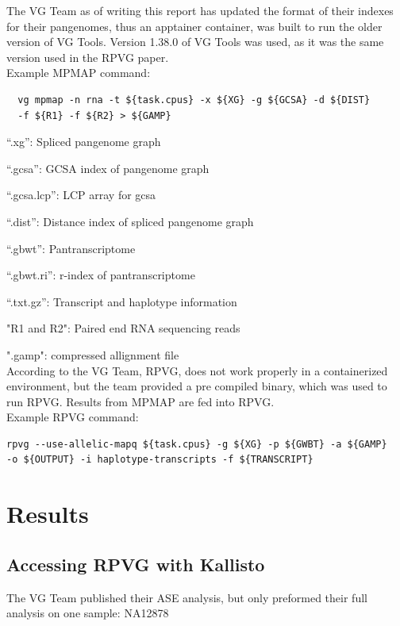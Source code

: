 \documentclass{article}
\begin{document}
 
The VG Team as of writing this report has updated the format of their indexes for their 
pangenomes, thus an apptainer container, was built to run the older version of VG Tools.
Version 1.38.0 of VG Tools was used, as it was the same version used in the RPVG paper.\\

Example MPMAP command:

\begin{lstlisting}
  vg mpmap -n rna -t ${task.cpus} -x ${XG} -g ${GCSA} -d ${DIST} 
  -f ${R1} -f ${R2} > ${GAMP}
  \end{lstlisting}

  “.xg”: Spliced pangenome graph 

  “.gcsa”: GCSA index of pangenome graph 
 
  “.gcsa.lcp”: LCP array for gcsa
 
  “.dist”: Distance index of spliced pangenome graph 
 
  “.gbwt”: Pantranscriptome 
 
  “.gbwt.ri”: r-index of pantranscriptome 
 
  “.txt.gz”: Transcript and haplotype information

  "R1 and R2": Paired end RNA sequencing reads
  
  ".gamp": compressed allignment file\\

According to the VG Team, RPVG, does not work properly in a containerized environment, but
the team provided a pre compiled binary, which was used to run RPVG. Results from MPMAP are
fed into RPVG.\\

Example RPVG command:

\begin{lstlisting}
rpvg --use-allelic-mapq ${task.cpus} -g ${XG} -p ${GWBT} -a ${GAMP} 
-o ${OUTPUT} -i haplotype-transcripts -f ${TRANSCRIPT}
\end{lstlisting}

\section{Results}

\subsection{Accessing RPVG with Kallisto}

The VG Team published their ASE analysis, but only preformed their full analysis on one sample: NA12878
\end{document}
